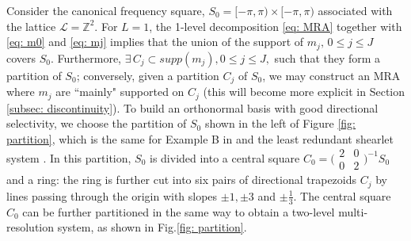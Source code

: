 Consider the canonical frequency square, $S_0 = [-\pi,\pi)\times[-\pi,\pi)$ associated with the lattice $\mathcal{L} = \mathbb{Z}^2$. 
For $L=1$, the 1-level decomposition \eqref{eq: MRA} together with \eqref{eq: m0} and \eqref{eq: mj} implies that the union of the support of $m_j,\,0\leq j\leq J$ covers $S_0$.
Furthermore, $\exists\, C_j\subset supp(m_j), 0\leq j\leq J,$ such that they form a partition of $S_0$; conversely, given a partition $C_j$ of $S_0$, we may construct an MRA where $m_j$ are ``mainly" supported on $C_j$ (this will become more explicit in Section \ref{subsec: discontinuity}).
To build an orthonormal basis with good directional selectivity, we choose the partition of $S_0$ shown in the left of Figure \ref{fig: partition}, which is the same for Example B in \cite{durand2007} and the least redundant shearlet system \cite{kutyniok2012digital}. In this partition, $S_0$ is divided into a central square $C_0 = \bigl(\begin{smallmatrix} 2&0\\0&2\end{smallmatrix}\bigr)^{-1}S_0$ and a ring: the ring is further cut into six pairs of directional trapezoids $C_j$ by lines passing through the origin with slopes $\pm 1, \pm 3$ and $\pm \frac{1}{3}$. The central square $C_0$ can be further partitioned in the same way to obtain a two-level multi-resolution system, as shown in Fig.\ref{fig: partition}. 



